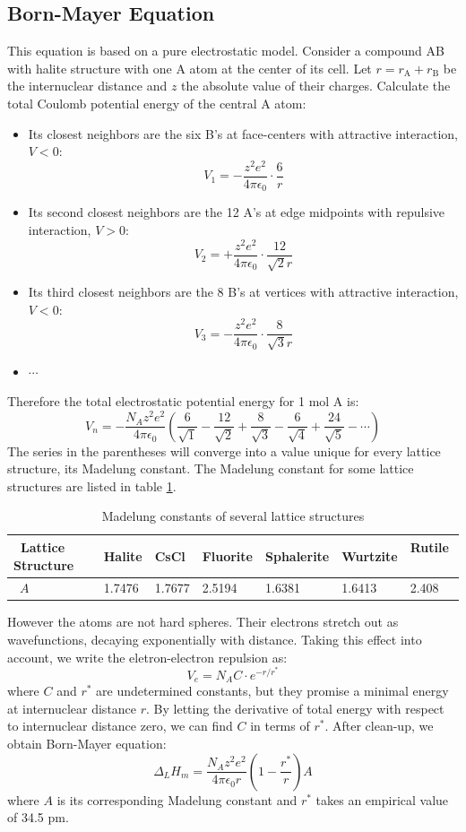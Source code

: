 \subsection{Born-Mayer Equation}
%
This equation is based on a pure electrostatic model. 
Consider a compound AB with halite structure with one A atom at the center of its cell.
Let $r = r_\text{A}+r_\text{B}$ be the internuclear distance and $z$ the absolute value of their charges.
Calculate the total Coulomb potential energy of the central A atom:
%
\begin{itemize}
	\item Its closest neighbors are the six B's at face-centers with attractive interaction, $V<0$: 
	\[
		V_1 = -\frac{z^2e^2}{4\pi\epsilon_0}\cdot\frac{6}{r}
	\]
	\item Its second closest neighbors are the 12 A's at edge midpoints with repulsive interaction, $V>0$:
	\[
		V_2 = +\frac{z^2e^2}{4\pi\epsilon_0}\cdot\frac{12}{\sqrt{2}r}
	\]
	\item Its third closest neighbors are the 8 B's at vertices with attractive interaction, $V<0$:
	\[
		V_3 = -\frac{z^2e^2}{4\pi\epsilon_0}\cdot\frac{8}{\sqrt{3}r}
	\]
	\item $\cdots$
\end{itemize}
%
Therefore the total electrostatic potential energy for 1 mol A is:
%
\[
	V_n = -\frac{N_Az^2e^2}{4\pi\epsilon_0}
	\left( \frac{6}{\sqrt{1}} - \frac{12}{\sqrt{2}} + \frac{8}{\sqrt{3}} - \frac{6}{\sqrt{4}} + \frac{24}{\sqrt{5}} -\cdots \right)
\]
%
The series in the parentheses will converge into a value unique for every lattice structure, its Madelung constant.
The Madelung constant for some lattice structures are listed in table \ref{madelung}.
%
\begin{table}
	\centering
	\begin{tabular}{@{}lllllll@{}}
		\toprule
		\ \textbf{Lattice Structure}	&	Halite	&	CsCl	&	Fluorite	&	Sphalerite	&	Wurtzite	&	Rutile	\ \\
		\midrule
		\ $A$							&	1.7476	&	1.7677	&	2.5194		&	1.6381		&	1.6413		&	2.408	\ \\
		\bottomrule
	\end{tabular}
	\caption{Madelung constants of several lattice structures}
	\label{madelung}
\end{table}
%
However the atoms are not hard spheres. Their electrons stretch out as wavefunctions, decaying exponentially with distance.
Taking this effect into account, we write the eletron-electron repulsion as:
%
\[
	V_e = N_AC\cdot e^{-r/r^*}
\]
%
where $C$ and $r^*$ are undetermined constants, but they promise a minimal energy at internuclear distance $r$.
By letting the derivative of total energy with respect to internuclear distance zero, we can find $C$ in terms of $r^*$.
After clean-up, we obtain Born-Mayer equation:
%
\[
	\Delta_LH_m = \frac{N_Az^2e^2}{4\pi\epsilon_0r}
	\left(1-\frac{r^*}{r}\right)A
\]
%
where $A$ is its corresponding Madelung constant and $r^*$ takes an empirical value of 34.5 pm.
%
